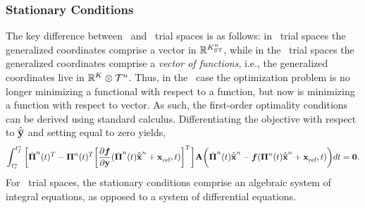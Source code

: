 \subsubsection{Stationary Conditions} 
The key difference between \spaceTimeAcronym\ and \spatialAcronym\ trial spaces is as follows: in \spaceTimeAcronym\ trial spaces the generalized coordinates comprise a vector in $\RR{\stdimArg{n}}$, while in the \spatialAcronym\ trial spaces the generalized coordinates comprise a \textit{vector of functions}, i.e., the generalized coordinates live in $\RR{\romdim} \otimes \timeSpaceArg{n}$. 
Thus, in the \spaceTimeAcronym\ case the optimization problem is no longer minimizing a functional with respect to a function, but now is minimizing a function with 
respect to vector.  As such, the first-order optimality conditions can be derived using standard calculus. Differentiating the objective with respect to $\stgenstatey$ and setting equal to zero yields,
\begin{equation}\label{eq:st_stationary}
 \intSlabArg{n} \bigg[ \stbasisDotArg{n}{t}^T  - \stbasisArg{n}{t}^T \bigg[\frac{\partial
\velocity}{\partial \stateyDiscrete} (\stbasisDotArg{n}{t} \stgenstateArg{n} +                    
\stateInterceptArg{n},t)\bigg]^T  \bigg] \stweightingMatArg{n} \bigg( \stbasisDotArg{n}{t} \stgenstateArg{n}  - \velocity (\stbasisArg{n}{t} \stgenstateArg{n} + \stateInterceptArg{n},t) \bigg) dt = \bz.\end{equation}
For \spaceTimeAcronym\ trial spaces, the stationary conditions comprise an algebraic system of integral equations, as opposed to a system of differential equations.
